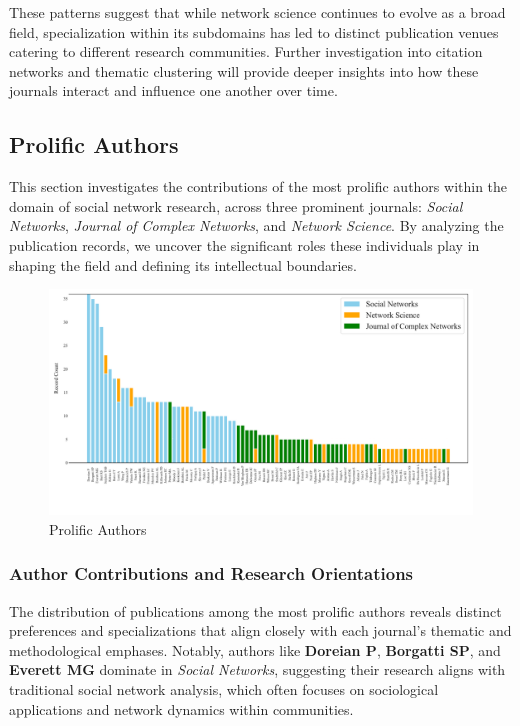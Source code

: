 \documentclass[twocolumn]{article}
\begin{document}
	These patterns suggest that while network science continues to evolve as a broad field, specialization within its subdomains has led to distinct publication venues catering to different research communities. Further investigation into citation networks and thematic clustering will provide deeper insights into how these journals interact and influence one another over time.
	
	
	\subsection{Prolific Authors}\label{Prolific Authors}
	
	This section investigates the contributions of the most prolific authors within the domain of social network research, across three prominent journals: \textit{Social Networks}, \textit{Journal of Complex Networks}, and \textit{Network Science}. By analyzing the publication records, we uncover the significant roles these individuals play in shaping the field and defining its intellectual boundaries.
	
	\begin{figure}[htbp]
		\centering
		\includegraphics[width=\textwidth]{images/Top 30 Authors by Publication Count Across Three Journals.pdf}
		\caption{Prolific Authors}
		\label{fig.fig2}
	\end{figure}
	
	\subsubsection*{Author Contributions and Research Orientations}
	
	The distribution of publications among the most prolific authors reveals distinct preferences and specializations that align closely with each journal's thematic and methodological emphases. Notably, authors like \textbf{Doreian P}, \textbf{Borgatti SP}, and \textbf{Everett MG} dominate in \textit{Social Networks}, suggesting their research aligns with traditional social network analysis, which often focuses on sociological applications and network dynamics within communities.
	
\end{document}

